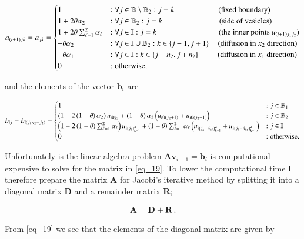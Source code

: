 \documentclass[11pt,english,a4paper]{article}
\begin{document}
\begin{flushleft}
\begin{align}
a_{(i+1)jk} = a_{jk} = \begin{cases} 
1 &:\forall j\in\mathbb{B}\setminus\mathbb{B}_2  : j=k \,\,\,\,\quad\qquad\qquad \text{(fixed boundary)}\\
1+ 2\theta \alpha_2 &: \forall j\in\mathbb{B}_2: j=k \,\,\quad\qquad\qquad\qquad (\text{side of vesicles}) \\ 
1+ 2\theta \sum_{\ell = 1}^2 \alpha_\ell &: \forall j\in\mathbb{I}: j=k \qquad\qquad\qquad\qquad (\text{the inner points }u_{(i+1)j_1j_2}) \\ 
-\theta \alpha_2 &: \forall j\in\mathbb{I}\cup\mathbb{B}_2: k\in\left\lbrace{j-1,j+1}\right\rbrace\quad \text{(diffusion in $x_2$ direction)} \\ 
- \theta \alpha_1 &: \forall j\in\mathbb{I} : k \in \left\lbrace{j-n_2,j+n_2}\right\rbrace \,\,\qquad\text{(diffusion in $x_1$ direction)} \\
 0 & : \text{otherwise,} \end{cases}
\label{eq_19}
\end{align}

and the elements of the vector $\textbf{b}_i$ are

\begin{align}
b_{ij} = b_{i(j_1 n_2 + j_2)} = \begin{cases}
1 &: j\in\mathbb{B}_1 \\
\left({1-2\left({1-\theta}\right)\alpha_2}\right) u_{i0j_2} + \left({1-\theta}\right)\alpha_2\left({u_{i0(j_2+1)} + u_{i0(j_2-1)}}\right) &: j\in\mathbb{B}_2 \\
\left({1-2\left({1-\theta}\right)\sum_{\ell = 1}^2 \alpha_\ell}\right) u_{i\left\lbrace{j_k}\right\rbrace_{k=1}^2} + \left({1-\theta}\right)\sum_{\ell=1}^2\alpha_\ell\left({u_{i\left\lbrace{j_k+\delta_{k\ell}}\right\rbrace_{k=1}^2} + u_{i\left\lbrace{j_k-\delta_{k\ell}}\right\rbrace_{k=1}^2}}\right) &: j\in\mathbb{I} \\
0 &: \text{otherwise.}
\end{cases}
\label{eq_20}
\end{align}

Unfortunately  is the linear algebra problem $\textbf{A}\textbf{v}_{i+1} = \textbf{b}_i$ is computational expensive to solve for the matrix in \eqref{eq_19}. To lower the computational time I therefore prepare the matrix $\textbf{A}$ for Jacobi's iterative method by splitting it into a diagonal matrix $\textbf{D}$ and a remainder matrix $\textbf{R}$;

\begin{align*}
\textbf{A} = \textbf{D} + \textbf{R} \,.
\end{align*}

From \eqref{eq_19} we see that the elements of the diagonal matrix are given by


\end{flushleft}
\end{document}
